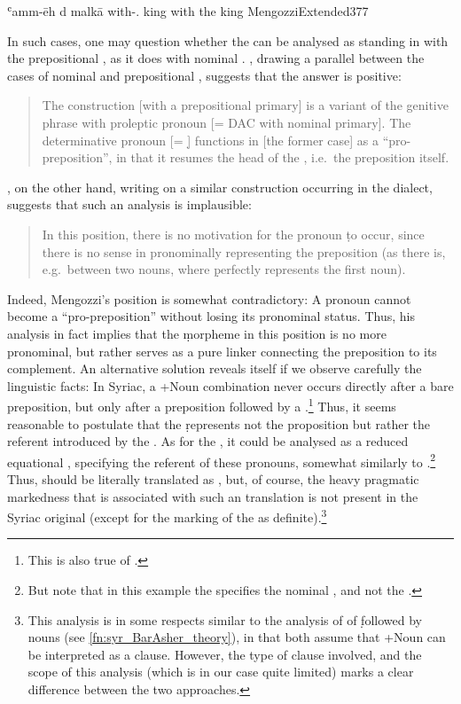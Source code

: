 {{{{
{ʿamm-ēh d\cb{} malkā}
{with-\poss.\masc{} \lnk\cb{} king}
{with the king}
{MengozziExtended}{377}

In such cases, one may question whether the \lnk* can be analysed as standing in  with the prepositional \prim, as it does with nominal \prims. \citet[372]{MengozziExtended}, drawing a parallel between the cases of nominal \prims and prepositional \prims, suggests that the answer is positive: \blockquote{The construction [with a prepositional primary] is a variant of the genitive phrase with proleptic
pronoun [= DAC with nominal primary]. The determinative pronoun [= \d] functions in [the former case] as a \enquote{pro-preposition}, in that it resumes the head of the , i.e.\ the preposition itself.}

\citet[118]{CohenEzafe}, on the other hand, writing on a similar construction occurring in the  \JZax dialect, suggests that such an analysis is implausible: \blockquote{In this position, there is no motivation for the pronoun \d to occur, since there is no sense in pronominally representing the preposition (as there is, e.g.\ between two nouns, where \d perfectly represents the first noun).} 

Indeed, Mengozzi's position is somewhat contradictory: A pronoun cannot become a \enquote{pro-preposition} without losing its pronominal status. Thus, his analysis in fact implies that the \d morpheme in this position is no more pronominal, but rather serves as a pure linker connecting the preposition to its complement. An alternative solution reveals itself if we observe carefully the linguistic facts: In Syriac, a \D+Noun combination never occurs directly after a bare preposition, but only after a preposition followed by a .\footnote{This is also true of \JBA \citep[95]{BarAsherJBA}.} Thus, it seems reasonable to postulate that the \d represents not the proposition but rather the referent introduced by the . As for the \secn, it could be analysed as a reduced equational , specifying the referent of these pronouns, somewhat similarly to .\footnote{But note that in this example the \secn specifies the nominal \prim, and not the .} Thus,  should be literally translated as , but, of course, the heavy pragmatic markedness that is associated with such an  translation is not present in the Syriac original (except for the marking of the \secn as definite).\footnote{This analysis is in some respects similar to the analysis of \citet{BarAsherAdnominal} of \d followed by nouns (see \vref{fn:syr_BarAsher_theory}), in that both assume that \D+Noun can be interpreted as a clause. However, the type of clause involved, and the scope of this analysis (which is in our case quite limited) marks a clear difference between the two approaches.}

}}}}
